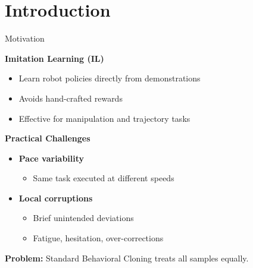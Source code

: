 \section{Introduction}

\begin{frame}{Motivation}

    \textbf{Imitation Learning (IL)}
    \begin{itemize}
        \item Learn robot policies directly from demonstrations
        \item Avoids hand-crafted rewards
        \item Effective for manipulation and trajectory tasks
    \end{itemize}

    \vspace{0.5em}

    \textbf{Practical Challenges}
    \begin{itemize}
        \item \textbf{Pace variability}
            \begin{itemize}
                \item Same task executed at different speeds
            \end{itemize}

        \item \textbf{Local corruptions}
            \begin{itemize}
                \item Brief unintended deviations
                \item Fatigue, hesitation, over-corrections
            \end{itemize}
    \end{itemize}

    \vspace{0.5em}

    \textbf{Problem:}
    Standard Behavioral Cloning treats all samples equally.

\end{frame}

